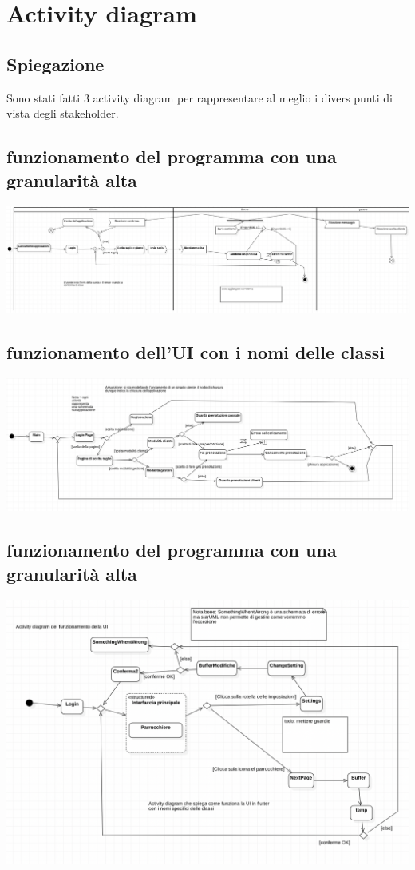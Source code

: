 \documentclass{article}
\begin{document}
\newpage
\section{Activity diagram} 
\subsection{Spiegazione}
Sono stati fatti 3 activity diagram per rappresentare al meglio 
i divers punti di vista degli stakeholder.
\subsection{funzionamento del programma con una granularità alta}
\includegraphics[scale = 0.38]{ImmaginiUML/Activity1.png}
\subsection{funzionamento dell'UI con i nomi delle classi}
\includegraphics[scale = 0.45]{ImmaginiUML/Activity2.png}
\subsection{funzionamento del programma con una granularità alta}
\includegraphics[scale = 0.5]{ImmaginiUML/Activity3.png}
\end{document}
